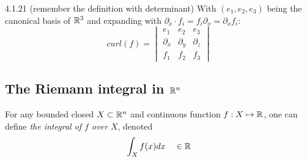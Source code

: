 \begin{remark}{4.1.21 (remember the definition with determinant)}
    With $(e_1, e_2, e_3)$ being the canonical basis of $\mathbb{R}^3$ and expanding
    with $\partial_x \cdot f_i = f_i \partial_x = \partial_x f_i$:
    \[
        curl(f) = \begin{vmatrix}
            e_1        & e_2        & e_3        \\
            \partial_x & \partial_y & \partial_z \\
            f_1        & f_2        & f_3
        \end{vmatrix}
    \]
\end{remark}

\subsection{The Riemann integral in $\mathbb{R}^n$}

For any bounded closed $X \subset \mathbb{R}^n$ and continuous function $f: X \mapsto \mathbb{R}$,
one can define \textit{the integral of $f$ over $X$}, denoted
\[ \int_X f(x) dx \quad \in \mathbb{R}\]

